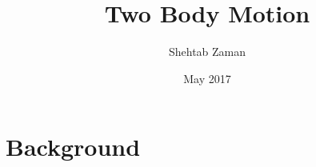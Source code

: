 \documentclass{article}
\title{Two Body Motion}
\author{Shehtab Zaman }
\date{May 2017}
\begin{document}
\maketitle
\section{Background}
\end{document}
